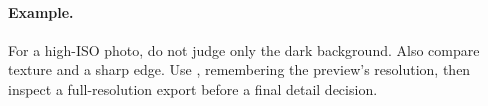 \paragraph{Example.}
For a high-ISO photo, do not judge only the dark background. Also compare
texture and a sharp edge. Use , remembering the preview's
resolution, then inspect a full-resolution export before a final detail decision.

\gestesreglages
